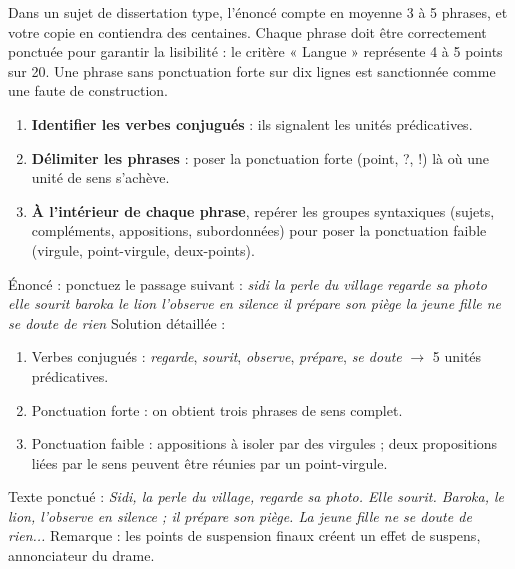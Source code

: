 \documentclass[11pt]{article}
\begin{document}
\begin{exemplebox}
Dans un sujet de dissertation type, l'énoncé compte en moyenne 3 à 5 phrases, et votre copie en contiendra des centaines. Chaque phrase doit être correctement ponctuée pour garantir la lisibilité : le critère « Langue » représente 4 à 5 points sur 20. Une phrase sans ponctuation forte sur dix lignes est sanctionnée comme une faute de construction.
\end{exemplebox}

\begin{methode}
\begin{enumerate}
\item \textbf{Identifier les verbes conjugués} : ils signalent les unités prédicatives.
\item \textbf{Délimiter les phrases} : poser la ponctuation forte (point, ?, !) là où une unité de sens s'achève.
\item \textbf{À l'intérieur de chaque phrase}, repérer les groupes syntaxiques (sujets, compléments, appositions, subordonnées) pour poser la ponctuation faible (virgule, point-virgule, deux-points).
\end{enumerate}
\end{methode}

\begin{exoresolu}
Énoncé : ponctuez le passage suivant : \emph{sidi la perle du village regarde sa photo elle sourit baroka le lion l'observe en silence il prépare son piège la jeune fille ne se doute de rien}
\tcblower
Solution détaillée :
\begin{enumerate}
\item Verbes conjugués : \emph{regarde}, \emph{sourit}, \emph{observe}, \emph{prépare}, \emph{se doute} $\rightarrow$ 5 unités prédicatives.
\item Ponctuation forte : on obtient trois phrases de sens complet.
\item Ponctuation faible : appositions à isoler par des virgules ; deux propositions liées par le sens peuvent être réunies par un point-virgule.
\end{enumerate}
Texte ponctué : \emph{Sidi, la perle du village, regarde sa photo. Elle sourit. Baroka, le lion, l'observe en silence ; il prépare son piège. La jeune fille ne se doute de rien...}
Remarque : les points de suspension finaux créent un effet de suspens, annonciateur du drame.
\end{exoresolu}
\end{document}
